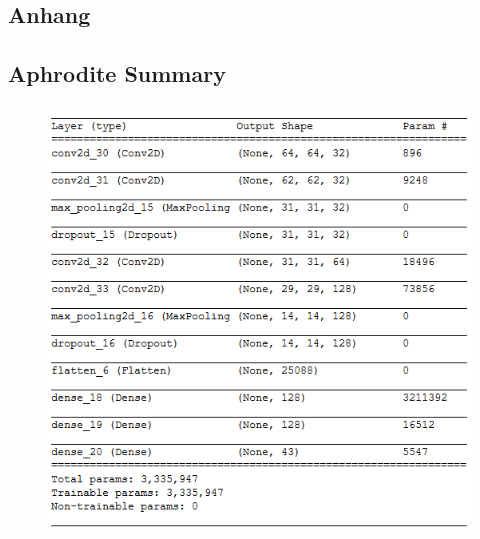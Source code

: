 \documentclass[12pt,a4paper,oneside, 
liststotoc, 					%
bibtotoc,						%
titlepage, 						%
headsepline, 					%
BCOR6mm,						%
]{scrreprt}
\begin{document}
\begin{appendix}
\clearpage
{}						%
\chapter{Anhang}
\section*{Aphrodite Summary}
\label{app:Aphrodite}
\begin{figure}[h]
	\centering
	\includegraphics[width=0.9\linewidth]{Images/AphroditeSummary}
	\label{fig:aphroditesummary}
\end{figure}

\end{appendix}
\end{document}
